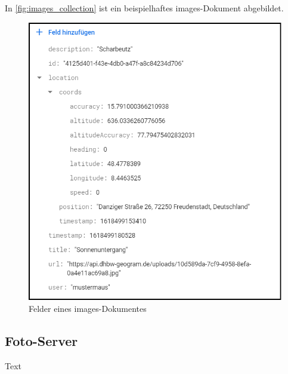 In \autoref{fig:images_collection} ist ein beispielhaftes images-Dokument abgebildet.

\begin{figure}[H]
    \centering
    \includegraphics[width=.7\linewidth]{images/collection_images.png}
    \caption{Felder eines \glqq images\grqq{}-Dokumentes}
    \label{fig:images_collection}
\end{figure}

\subsection{Foto-Server\label{sup3.2.1:Unterpunkt-1}}

Text